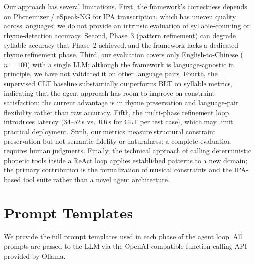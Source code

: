 \documentclass[11pt]{article}
\begin{document}
Our approach has several limitations.
First, the framework's correctness depends on Phonemizer / eSpeak-NG for IPA transcription, which has uneven quality across languages; we do not provide an intrinsic evaluation of syllable-counting or rhyme-detection accuracy.
Second, Phase~3 (pattern refinement) can degrade syllable accuracy that Phase~2 achieved, and the framework lacks a dedicated rhyme refinement phase.
Third, our evaluation covers only English-to-Chinese ($n{=}100$) with a single LLM; although the framework is language-agnostic in principle, we have not validated it on other language pairs.
Fourth, the supervised CLT baseline substantially outperforms BLT on syllable metrics, indicating that the agent approach has room to improve on constraint satisfaction; the current advantage is in rhyme preservation and language-pair flexibility rather than raw accuracy.
Fifth, the multi-phase refinement loop introduces latency (34--52\,s vs.\ 0.6\,s for CLT per test case), which may limit practical deployment.
Sixth, our metrics measure structural constraint preservation but not semantic fidelity or naturalness; a complete evaluation requires human judgments.
Finally, the technical approach of calling deterministic phonetic tools inside a ReAct loop applies established patterns \citep{yao-etal-2023-react,gao-etal-2023-pal,schick-etal-2023-toolformer} to a new domain; the primary contribution is the formalization of musical constraints and the IPA-based tool suite rather than a novel agent architecture.



\appendix

\section{Prompt Templates}
\label{app:prompts}

We provide the full prompt templates used in each phase of the agent loop.
All prompts are passed to the LLM via the OpenAI-compatible function-calling API provided by Ollama.
\end{document}
